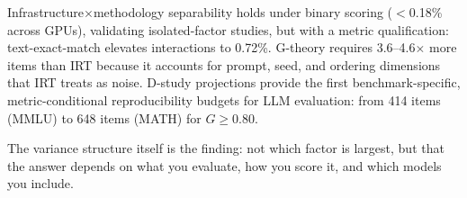 \documentclass[11pt,a4paper]{article}
\newcommand{\Gcoeff}{\ensuremath{G}}
\begin{document}
Infrastructure$\times$methodology separability holds under binary scoring ($<$0.18\% across GPUs), validating isolated-factor studies, but with a metric qualification: text-exact-match elevates interactions to 0.72\%.
G-theory requires 3.6--4.6$\times$ more items than IRT because it accounts for prompt, seed, and ordering dimensions that IRT treats as noise.
D-study projections provide the first benchmark-specific, metric-conditional reproducibility budgets for LLM evaluation: from 414 items (MMLU) to 648 items (MATH) for $\Gcoeff\geq0.80$.

The variance structure itself is the finding: not which factor is largest, but that the answer depends on what you evaluate, how you score it, and which models you include.



\end{document}

